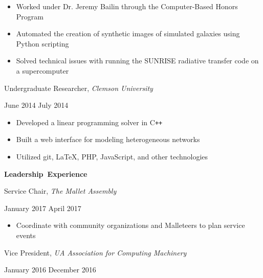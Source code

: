 \documentclass[11pt]{article}
\begin{document}
\begin{itemize}
  \item Worked under Dr. Jeremy Bailin through the Computer-Based Honors Program
  \item Automated the creation of synthetic images of simulated galaxies using Python scripting
  \item Solved technical issues with running the SUNRISE radiative transfer code on a supercomputer
\end{itemize}

\begin{minipage}[t]{0.65\textwidth}
\flushleft
Undergraduate Researcher, \textit{Clemson University}\\
\end{minipage}
\begin{minipage}[t]{0.30\textwidth}
\flushright
June 2014 \space \textemdash \space July 2014\\
\end{minipage}

\begin{itemize}
  \item Developed a linear programming solver in C\texttt{++}
  \item Built a web interface for modeling heterogeneous networks
  \item Utilized git, \LaTeX, PHP, JavaScript, and other technologies
\end{itemize}

\vspace{0.8em}
\hbox{\large \textbf{Leadership Experience}}

\vspace{0.4em}
\begin{minipage}[t]{0.65\textwidth}
\flushleft
Service Chair, \textit{The Mallet Assembly}\\
\end{minipage}
\begin{minipage}[t]{0.30\textwidth}
\flushright
January 2017 \space \textemdash \space April 2017\\
\end{minipage}

\begin{itemize}
  \item Coordinate with community organizations and Malleteers to plan service events
\end{itemize}

\vspace{0.4em}
\begin{minipage}[t]{0.65\textwidth}
\flushleft
Vice President, \textit{UA Association for Computing Machinery}\\
\end{minipage}
\begin{minipage}[t]{0.30\textwidth}
\flushright
January 2016 \space \textemdash \space December 2016\\
\end{minipage}
\end{document}
